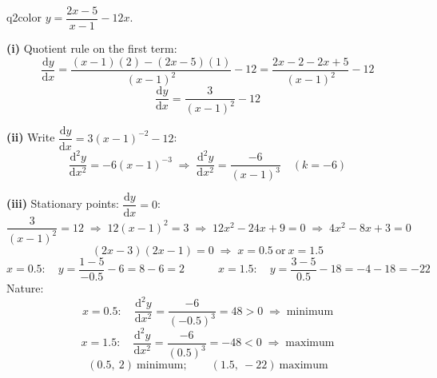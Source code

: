 \documentclass[11pt,a4paper]{article}
\begin{document}
\begin{ansbox}{q2color}
$y=\dfrac{2x-5}{x-1}-12x$.

\textbf{(i)} Quotient rule on the first term:
\[ \frac{\mathrm{d}y}{\mathrm{d}x}=\frac{(x-1)(2)-(2x-5)(1)}{(x-1)^2}-12=\frac{2x-2-2x+5}{(x-1)^2}-12 \]
\[ \boxed{\frac{\mathrm{d}y}{\mathrm{d}x}=\frac{3}{(x-1)^2}-12} \]

\textbf{(ii)} Write $\dfrac{\mathrm{d}y}{\mathrm{d}x}=3(x-1)^{-2}-12$:
\[ \frac{\mathrm{d}^2y}{\mathrm{d}x^2}=-6(x-1)^{-3} \;\Rightarrow\; \boxed{\frac{\mathrm{d}^2y}{\mathrm{d}x^2}=\frac{-6}{(x-1)^3}}\quad(k=-6) \]

\textbf{(iii)} Stationary points: $\dfrac{\mathrm{d}y}{\mathrm{d}x}=0$:
\[ \frac{3}{(x-1)^2}=12 \;\Rightarrow\; 12(x-1)^2=3 \;\Rightarrow\; 12x^2-24x+9=0 \;\Rightarrow\; 4x^2-8x+3=0 \]
\[ (2x-3)(2x-1)=0 \;\Rightarrow\; x=0.5 \ \text{or}\ x=1.5 \]
\[ x=0.5:\quad y=\frac{1-5}{-0.5}-6=8-6=2 \qquad\quad x=1.5:\quad y=\frac{3-5}{0.5}-18=-4-18=-22 \]
Nature:
\[ x=0.5:\quad \frac{\mathrm{d}^2y}{\mathrm{d}x^2}=\frac{-6}{(-0.5)^3}=48>0 \;\Rightarrow\; \text{minimum} \]
\[ x=1.5:\quad \frac{\mathrm{d}^2y}{\mathrm{d}x^2}=\frac{-6}{(0.5)^3}=-48<0 \;\Rightarrow\; \text{maximum} \]
\[ \boxed{(0.5,\ 2)\ \text{minimum};\qquad (1.5,\ -22)\ \text{maximum}} \]
\end{ansbox}
\end{document}

